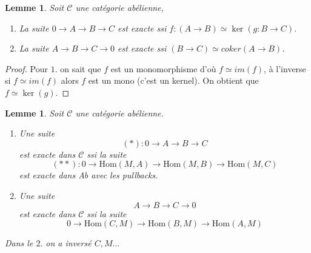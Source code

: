 \documentclass[a4paper,12pt]{book}
\newcommand{\Cat}{\mathcal{C}}
\newcommand{\Hom}{\textrm{Hom}}
\theoremstyle{plain}
\newtheorem{lem}[subsection]{Lemme}
\theoremstyle{definition}
\theoremstyle{remark}
\begin{document}
\begin{lem}
    Soit $\Cat$ une catégorie abélienne, 
    \begin{enumerate}
	\item La suite $0\to A\to B\to C$ est exacte ssi 
	    $f\colon (A\to B)\simeq \ker(g\colon B\to C)$.
	\item La suite $ A\to B\to C\to 0$ est exacte ssi $(B\to C)\simeq
	    coker(A\to B)$.
    \end{enumerate}
\end{lem}
\begin{proof}
    Pour $1.$ on sait que $f$ est un monomorphisme d'où
    $f\simeq im(f)$, à l'inverse si $f\simeq im(f)$ alors $f$ est un mono
    (c'est un kernel). On obtient que $f\simeq \ker(g)$.
\end{proof}
\begin{lem}
    Soit $\Cat$ une catégorie abélienne.
    \begin{enumerate}
	\item Une suite \[(*)\colon 0\to A\to B\to C\] est exacte
	    dans $\Cat$ ssi la suite 
	\[(**)\colon 0\to\Hom(M,A)\to\Hom(M,B)\to\Hom(M,C)\]
	est exacte dans Ab avec les pullbacks.
	\item Une suite \[ A\to B\to C\to0\] est exacte
	    dans $\Cat$ ssi la suite 
	\[0\to\Hom(C,M)\to\Hom(B,M)\to\Hom(A,M)\]
    \end{enumerate}
    Dans le $2.$ on a inversé $C,M\ldots$
\end{lem}
\end{document}
